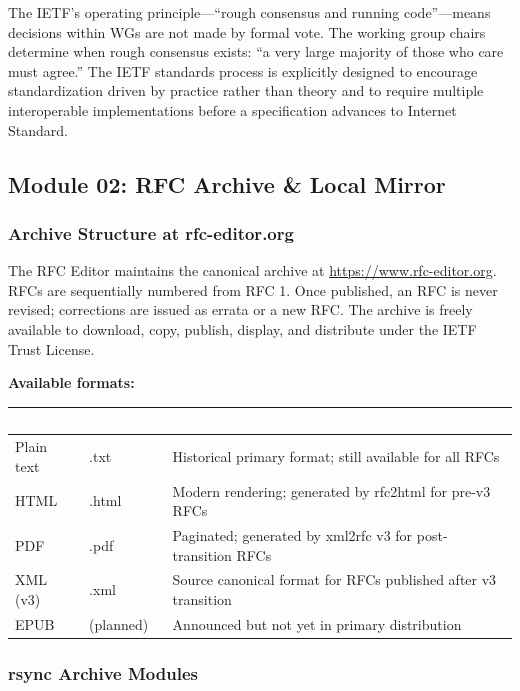 \documentclass[11pt,letterpaper]{article}
\newcommand{\tableheader}[1]{\textbf{\sffamily\textcolor{white}{#1}}}
\begin{document}
The IETF's operating principle---``rough consensus and running code''---means decisions within WGs are not made by formal vote. The working group chairs determine when rough consensus exists: ``a very large majority of those who care must agree.'' The IETF standards process is explicitly designed to encourage standardization driven by practice rather than theory and to require multiple interoperable implementations before a specification advances to Internet Standard.

\subsection{Module 02: RFC Archive \& Local Mirror}

\subsubsection{Archive Structure at rfc-editor.org}

The RFC Editor maintains the canonical archive at \url{https://www.rfc-editor.org}. RFCs are sequentially numbered from RFC 1. Once published, an RFC is never revised; corrections are issued as errata or a new RFC. The archive is freely available to download, copy, publish, display, and distribute under the IETF Trust License.

\textbf{Available formats:}

\begin{center}
\begin{tabularx}{\textwidth}{L{2cm}L{2.5cm}X}
\toprule
{}
\tableheader{Format} & \tableheader{Extension} & \tableheader{Notes} \\
\midrule
Plain text & .txt & Historical primary format; still available for all RFCs \\
HTML & .html & Modern rendering; generated by rfc2html for pre-v3 RFCs \\
PDF & .pdf & Paginated; generated by xml2rfc v3 for post-transition RFCs \\
XML (v3) & .xml & Source canonical format for RFCs published after v3 transition \\
EPUB & (planned) & Announced but not yet in primary distribution \\
\bottomrule
\end{tabularx}
\end{center}

\subsubsection{rsync Archive Modules}
\end{document}
